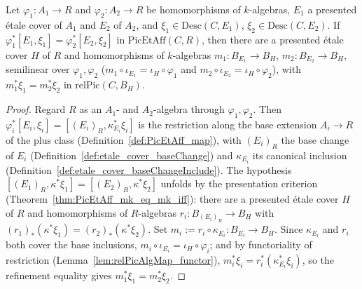 \begin{theorem}
  \label{thm:PicEtAff_exists_relPicAlgMap_eq}
  \leanok
  Let \(\varphi_1 \colon A_1 \to R\) and \(\varphi_2 \colon A_2 \to R\) be homomorphisms of
  \(k\)-algebras, \(E_1\) a presented \'etale cover of \(A_1\) and \(E_2\) of \(A_2\), and
  \(\xi_1 \in \mathrm{Desc}(C, E_1)\), \(\xi_2 \in \mathrm{Desc}(C, E_2)\). If \(\varphi_1^{*}
  [E_1, \xi_1] = \varphi_2^{*}[E_2, \xi_2]\) in \(\mathrm{PicEtAff}(C, R)\), then there are a
  presented \'etale cover \(H\) of \(R\) and homomorphisms of \(k\)-algebras \(m_1 \colon B_{E_1}
  \to B_H\), \(m_2 \colon B_{E_2} \to B_H\), semilinear over \(\varphi_1, \varphi_2\)
  (\(m_1 \circ \iota_{E_1} = \iota_H \circ \varphi_1\) and \(m_2 \circ \iota_{E_2} = \iota_H \circ
  \varphi_2\)), with \(m_1^{*}\xi_1 = m_2^{*}\xi_2\) in \(\mathrm{relPic}(C, B_H)\).
\end{theorem}
\begin{proof}
  \leanok
  Regard \(R\) as an \(A_1\)- and \(A_2\)-algebra through \(\varphi_1, \varphi_2\). Then
  \(\varphi_i^{*}[E_i, \xi_i] = [(E_i)_R, \kappa_{E_i}^{*}\xi_i]\) is the restriction along the base
  extension \(A_i \to R\) of the plus class (Definition~\ref{def:PicEtAff_map}), with \((E_i)_R\)
  the base change of \(E_i\) (Definition~\ref{def:etale_cover_baseChange}) and \(\kappa_{E_i}\) its
  canonical inclusion (Definition~\ref{def:etale_cover_baseChangeInclude}). The hypothesis
  \([(E_1)_R, \kappa^{*}\xi_1] = [(E_2)_R, \kappa^{*}\xi_2]\) unfolds by the presentation criterion
  (Theorem~\ref{thm:PicEtAff_mk_eq_mk_iff}): there are a presented \'etale cover \(H\) of \(R\) and
  homomorphisms of \(R\)-algebras \(r_i \colon B_{(E_i)_R} \to B_H\) with
  \((r_1)_{*}(\kappa^{*}\xi_1) = (r_2)_{*}(\kappa^{*}\xi_2)\). Set \(m_i := r_i \circ \kappa_{E_i}
  \colon B_{E_i} \to B_H\). Since \(\kappa_{E_i}\) and \(r_i\) both cover the base inclusions,
  \(m_i \circ \iota_{E_i} = \iota_H \circ \varphi_i\); and by functoriality of restriction
  (Lemma~\ref{lem:relPicAlgMap_functor}), \(m_i^{*}\xi_i = r_i^{*}(\kappa_{E_i}^{*}\xi_i)\), so the
  refinement equality gives \(m_1^{*}\xi_1 = m_2^{*}\xi_2\).
\end{proof}

